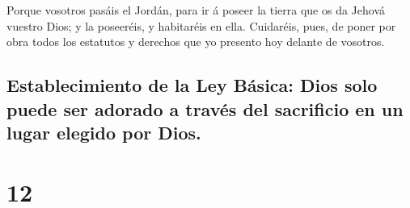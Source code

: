  Porque vosotros pasáis el Jordán, para ir á poseer la
tierra que os da Jehová vuestro Dios; y la poseeréis, y habitaréis en
ella.  Cuidaréis, pues, de poner por obra todos los
estatutos y derechos que yo presento hoy delante de vosotros.

\hypertarget{establecimiento-de-la-ley-buxe1sica-dios-solo-puede-ser-adorado-a-travuxe9s-del-sacrificio-en-un-lugar-elegido-por-dios.}{%
\subsection{Establecimiento de la Ley Básica: Dios solo puede ser
adorado a través del sacrificio en un lugar elegido por
Dios.}\label{establecimiento-de-la-ley-buxe1sica-dios-solo-puede-ser-adorado-a-travuxe9s-del-sacrificio-en-un-lugar-elegido-por-dios.}}

\hypertarget{section-11}{%
\section{12}\label{section-11}}

